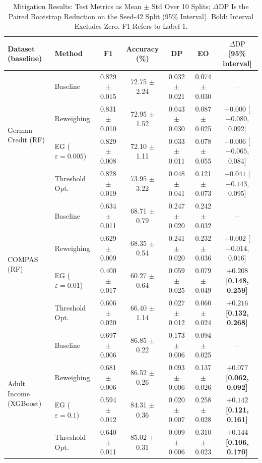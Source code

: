 \documentclass[conference]{IEEEtran}
\newcommand{\eps}{\varepsilon}
\newcommand{\DP}{\mathrm{DP}}
\begin{document}
\begin{table}[t]
\centering
\caption{Mitigation Results: Test Metrics as Mean $\pm$ Std Over 10 Splits; $\Delta\DP$ Is the Paired Bootstrap Reduction on the Seed-42 Split (95\% Interval). Bold: Interval Excludes Zero. F1 Refers to Label 1.}
\label{tab:main}
\renewcommand{\arraystretch}{1.12}
\footnotesize
\setlength{\tabcolsep}{5pt}
\begin{tabular}{|l|l|c|c|c|c|c|}
\hline
\textbf{Dataset (baseline)} & \textbf{Method} & \textbf{F1} & \textbf{Accuracy (\%)} & \textbf{DP} & \textbf{EO} & \textbf{$\Delta\DP$ [95\% interval]} \\
\hline
\multirow{4}{*}{German Credit (RF)}
 & Baseline & 0.829 $\pm$ 0.015 & 72.75 $\pm$ 2.24 & 0.032 $\pm$ 0.021 & 0.074 $\pm$ 0.030 & -- \\
 & Reweighing & 0.831 $\pm$ 0.010 & 72.95 $\pm$ 1.52 & 0.043 $\pm$ 0.030 & 0.087 $\pm$ 0.025 & $+0.000$ [$-0.080$, 0.092] \\
 & EG ($\eps{=}0.005$) & 0.829 $\pm$ 0.008 & 72.10 $\pm$ 1.11 & 0.033 $\pm$ 0.011 & 0.078 $\pm$ 0.055 & $+0.006$ [$-0.065$, 0.084] \\
 & Threshold Opt. & 0.828 $\pm$ 0.019 & 73.95 $\pm$ 3.22 & 0.048 $\pm$ 0.041 & 0.121 $\pm$ 0.073 & $-0.041$ [$-0.143$, 0.095] \\
\hline
\multirow{4}{*}{COMPAS (RF)}
 & Baseline & 0.634 $\pm$ 0.011 & 68.71 $\pm$ 0.79 & 0.247 $\pm$ 0.020 & 0.242 $\pm$ 0.032 & -- \\
 & Reweighing & 0.629 $\pm$ 0.009 & 68.35 $\pm$ 0.54 & 0.241 $\pm$ 0.020 & 0.232 $\pm$ 0.036 & $+0.002$ [$-0.014$, 0.016] \\
 & EG ($\eps{=}0.01$) & 0.400 $\pm$ 0.017 & 60.27 $\pm$ 0.64 & 0.059 $\pm$ 0.025 & 0.079 $\pm$ 0.049 & $\mathbf{+0.208}$ \textbf{[0.148, 0.259]} \\
 & Threshold Opt. & 0.606 $\pm$ 0.020 & 66.40 $\pm$ 1.14 & 0.027 $\pm$ 0.012 & 0.060 $\pm$ 0.024 & $\mathbf{+0.216}$ \textbf{[0.132, 0.268]} \\
\hline
\multirow{4}{*}{Adult Income (XGBoost)}
 & Baseline & 0.697 $\pm$ 0.006 & 86.85 $\pm$ 0.22 & 0.173 $\pm$ 0.006 & 0.094 $\pm$ 0.025 & -- \\
 & Reweighing & 0.681 $\pm$ 0.006 & 86.52 $\pm$ 0.26 & 0.093 $\pm$ 0.006 & 0.137 $\pm$ 0.026 & $\mathbf{+0.077}$ \textbf{[0.062, 0.092]} \\
 & EG ($\eps{=}0.1$) & 0.594 $\pm$ 0.012 & 84.31 $\pm$ 0.36 & 0.020 $\pm$ 0.007 & 0.258 $\pm$ 0.028 & $\mathbf{+0.142}$ \textbf{[0.121, 0.161]} \\
 & Threshold Opt. & 0.640 $\pm$ 0.011 & 85.02 $\pm$ 0.31 & 0.009 $\pm$ 0.006 & 0.310 $\pm$ 0.023 & $\mathbf{+0.144}$ \textbf{[0.106, 0.170]} \\
\hline
\end{tabular}
\end{table}
\end{document}
